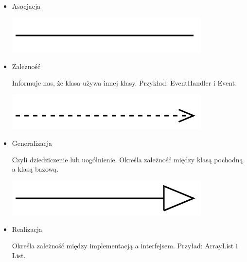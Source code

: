 \documentclass[12pt]{article}
\begin{document}
                \begin{itemize}
                    \item Asocjacja

                        \begin{center}
                            \includegraphics[scale=0.40]{ooad/association.png}
                        \end{center}
                    
                    \item Zależność
                        
                        Informuje nas, że klasa używa innej klasy. Przykład:
                        EventHandler i Event.
                        \begin{center}
                            \includegraphics[scale=0.40]{ooad/dependency.png}
                        \end{center}
                    
                    \item Generalizacja

                        Czyli dziedziczenie lub uogólnienie. Określa zależność 
                        między klasą pochodną a klasą bazową.
                        \begin{center}
                            \includegraphics[scale=0.40]{ooad/generalization.png}
                        \end{center}
                    
                    \item Realizacja

                        Określa zależność między implementacją a interfejsem.
                        Przyład: ArrayList i List.


\end{itemize}
\end{document}
